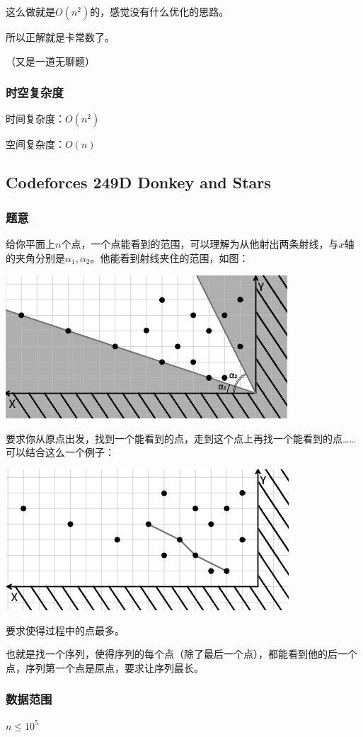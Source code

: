 \documentclass{ctexart}
\begin{document}
这么做就是$O(n^2)$的，感觉没有什么优化的思路。

所以正解就是卡常数了。

（又是一道无聊题）
\subsubsection{时空复杂度}
时间复杂度：$O(n^2)$

空间复杂度：$O(n)$
\subsection{Codeforces 249D Donkey and Stars}
\subsubsection{题意}
给你平面上$n$个点，一个点能看到的范围，可以理解为从他射出两条射线，与$x$轴的夹角分别是$\alpha_1,\alpha_2$。他能看到射线夹住的范围，如图：

\includegraphics{stars1.png}

要求你从原点出发，找到一个能看到的点，走到这个点上再找一个能看到的点……可以结合这么一个例子：

\includegraphics{stars2.png}

要求使得过程中的点最多。

也就是找一个序列，使得序列的每个点（除了最后一个点），都能看到他的后一个点，序列第一个点是原点，要求让序列最长。
\subsubsection{数据范围}
$n \le  10^5$
\end{document}

